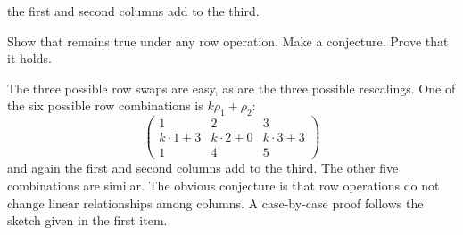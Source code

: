 \begin{exercises}
\begin{equation*}
    \end{equation*}
    the first and second columns add to the third.
    \begin{exparts}
      \partsitem Show that remains true under any row operation.
      \partsitem Make a conjecture.
      \partsitem Prove that it holds.
    \end{exparts}
    \begin{answer}
      \begin{exparts}
        \partsitem The three possible row swaps are easy, 
          as are the three possible rescalings.
          One of the six possible row combinations is \( k\rho_1+\rho_2 \):
          \begin{equation*}
            \begin{pmatrix}
              1           &2           &3  \\
              k\cdot 1+3  &k\cdot 2+0  &k\cdot 3+3  \\
              1           &4           &5
            \end{pmatrix}
          \end{equation*}
          and again the first and second columns add to the third.
          The other five combinations are similar.
        \partsitem The obvious conjecture is that row operations do not change
          linear relationships among columns.
        \partsitem A case-by-case 
          proof follows the sketch given in the first item.
      \end{exparts}  
   \end{answer}
\end{exercises}
